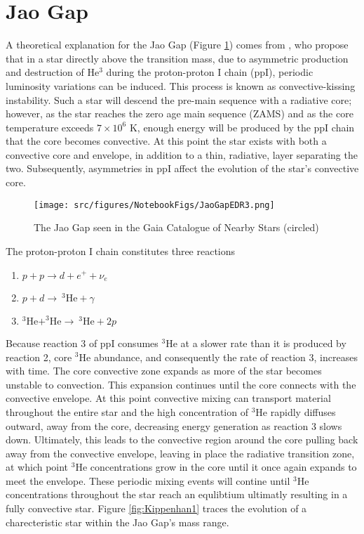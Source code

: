 \section{Jao Gap}\label{sec:JaoGap}
A theoretical explanation for the Jao Gap (Figure \ref{fig:JaoGap}) comes from
\citet{van2012}, who propose that in a star directly above the transition mass,
due to asymmetric production and destruction of He$^{3}$ during the
proton-proton I chain (ppI), periodic luminosity variations can be induced.
This process is known as convective-kissing instability. Such a star will
descend the pre-main sequence with a radiative core; however, as the star
reaches the zero age main sequence (ZAMS) and as the core temperature exceeds
$7\times 10^{6}$ K, enough energy will be produced by the ppI chain that the
core becomes convective. At this point the star exists with both a convective
core and envelope, in addition to a thin, radiative, layer separating the two.
Subsequently, asymmetries in ppI affect the evolution of the star's convective
core.

\begin{figure}
	\centering
	\texttt{[image: src/figures/NotebookFigs/JaoGapEDR3.png]}
	\caption{The Jao Gap seen in the Gaia Catalogue of Nearby Stars (circled)}
	\label{fig:JaoGap}
\end{figure}

The proton-proton I chain constitutes three reactions 
\begin{enumerate} 
	\item $p + p \longrightarrow d + e^{+} + \nu_{e}$
	\item $p + d \longrightarrow \ ^{3}\text{He} + \gamma$
	\item $^{3}\text{He} + ^{3}\text{He} \longrightarrow \ ^{3}\text{He} + 2p$ 
\end{enumerate} 
Because reaction 3 of ppI consumes $^{3}$He at a slower rate than it is
produced by reaction 2, core $^{3}$He abundance, and consequently the rate of
reaction 3, increases with time. The core convective zone expands as more of
the star becomes unstable to convection. This expansion continues until the
core connects with the convective envelope. At this point convective mixing can
transport material throughout the entire star and the high concentration
of $^{3}$He rapidly diffuses outward, away from the core, decreasing energy
generation as reaction 3 slows down. Ultimately, this leads to the convective
region around the core pulling back away from the convective envelope, leaving
in place the radiative transition zone, at which point $^{3}$He concentrations
grow in the core until it once again expands to meet the envelope.  These
periodic mixing events will contine until $^{3}$He concentrations throughout
the star reach an equlibtium ultimatly resulting in a fully convective star.
Figure \ref{fig:Kippenhan1} traces the evolution of a charecteristic star
within the Jao Gap's mass range.

